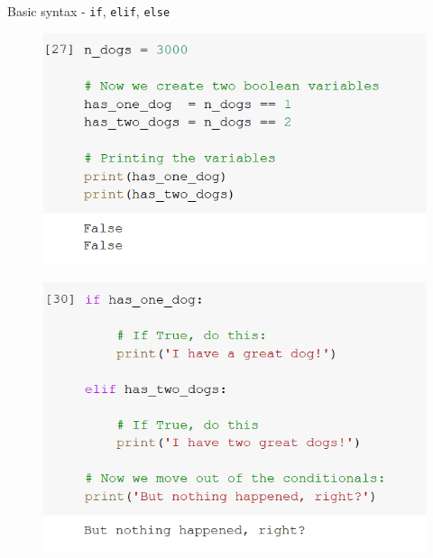 \documentclass[aspectratio=169]{beamer}
\begin{document}
\begin{frame}{Basic syntax - \texttt{if}, \texttt{elif}, \texttt{else}}

	\begin{multicols}{2}

		\begin{figure}
			\centering
			\includegraphics[width=\linewidth]{img/boolean_variables.png}
		\end{figure}
		\begin{figure}
			\centering
			\includegraphics[width=\linewidth]{img/if_elif.png}
		\end{figure}

	\end{multicols}

\end{frame}
\end{document}
